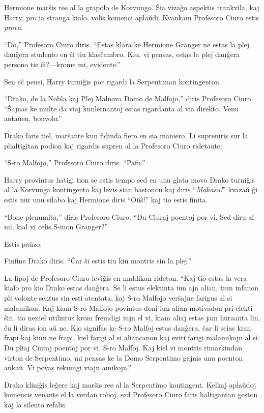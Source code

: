 Hermione marŝis ree al la grapolo de Korvungo. Ŝia vizaĝo aspektis
trankvila, kaj Harry, pro ia stranga kialo, volis komenci
aplaŭdi. Kvankam Profesoro Ciuro estis \emph{prava}.

``Do,'' Profesoro Ciuro diris. ``Estas klara ke Hermione Granger ne
estas la plej danĝera studento en ĉi tiu klasĉambro. Kiu, vi pensas,
estas la plej danĝera persono tie ĉi?—krome mi, evidente.''  

Sen eĉ pensi, Harry turniĝis por rigardi la Serpentiman kontingenton.

``Drako, de la Nobla kaj Plej Malnova Domo de Malfojo,'' diris
Profesoro Ciuro. ``Ŝajnas ke multe da viaj kunlernantoj estas
rigardanta al via direkto. Venu antaŭen, bonvolu.''

Drako faris tiel, marŝante kun fidinda fiero en sia maniero. Li
supreniris sur la plialtigitan podion kaj rigardis supren al la
Profesoro Ciuro ridetante.

``S-ro Malfojo,'' Profesoro Ciuro diris. ``Pafu.''

Harry provintus hatigi tion se estis tempo sed en unu glata movo Drako
turniĝis al la Korvunga kontingento kaj levis sian bastonon kaj diris
``\emph{Mahasu!}'' kvazaŭ ĝi estis nur unu silabo kaj Hermione diris
``Oŭŝ!'' kaj tio estis finita.

``Bone plenumita,'' diris Profesoro Ciuro. ``Du Ciuraj poentoj por
vi. Sed diru al mi, kial vi celis S-inon Granger?''

Estis paŭzo.

Finfine Drako diris. ``Ĉar ŝi estis tiu kiu montris sin la plej.''

La lipoj de Profesoro Ciuro leviĝis en maldikan rideton. ``Kaj tio
estas la vera kialo pro kio Drako estas danĝera. Se li estus elektinta
iun ajn alian, tiun infanon pli volonte sentus sin esti atentata, kaj
S-ro Malfojo verŝajne farigus al si malamikon. Kaj kiam S-ro Malfojo
povintus doni iun alian motivadon pri elekti ŝin, tio neniel utilintus
krom fremdigi iujn el vi, kiam aliaj estas jam huraanta lin, ĉu li
diras ion aŭ ne. Kio signifas ke S-ro Malfoj estas danĝera, ĉar li
scias kiun frapi kaj kiun ne frapi, kiel farigi al si aliancanon kaj
eviti farigi malamikojn al si. Du pliaj Ciuraj poentoj por vi, S-ro
Malfoj. Kaj kiel vi montris rimarkindan virton de Serpentimo, mi
pensas ke la Domo Serpentimo gajnis unu poenton ankaŭ. Vi povas
rekunigi viajn amikojn.''

Drako kliniĝis leĝere kaj marŝis ree al la Serpentimo
kontingent. Kelkaj aplaŭdoj komencis venante el la verdan roboj, sed
Profesoro Ciuro faris haltigantan geston kaj la silento refalis.

